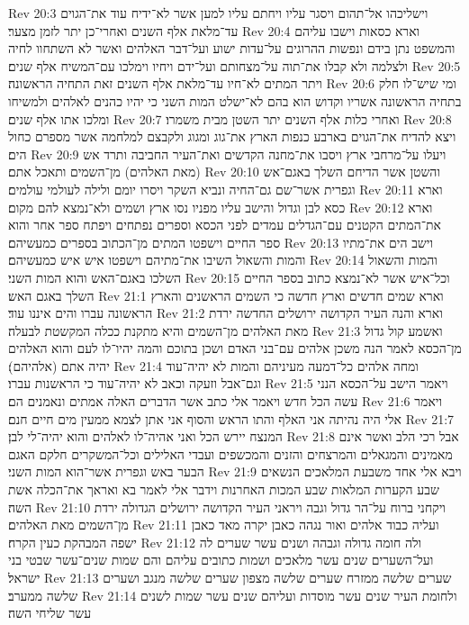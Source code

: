 Rev 20:3  וישליכהו אל־תהום ויסגר עליו ויחתם עליו למען אשר לא־ידיח עוד את־הגוים עד־מלאת אלף השנים ואחרי־כן יתר לזמן מצער׃
Rev 20:4  וארא כסאות וישבו עליהם והמשפט נתן בידם ונפשות ההרוגים על־עדות ישוע ועל־דבר האלהים ואשר לא השתחוו לחיה ולצלמה ולא קבלו את־תוה על־מצחותם ועל־ידם ויחיו וימלכו עם־המשיח אלף שנים׃
Rev 20:5  ויתר המתים לא־חיו עד־מלאת אלף השנים זאת התחיה הראשונה׃
Rev 20:6  ומי שיש־לו חלק בתחיה הראשונה אשריו וקדוש הוא בהם לא־ישלט המות השני כי יהיו כהנים לאלהים ולמשיחו ומלכו אתו אלף שנים׃
Rev 20:7  ואחרי כלות אלף השנים יתר השטן מבית משמרו׃
Rev 20:8  ויצא להדיח את־הגוים בארבע כנפות הארץ את־גוג ומגוג ולקבצם למלחמה אשר מספרם כחול הים׃
Rev 20:9  ויעלו על־מרחבי ארץ ויסבו את־מחנה הקדשים ואת־העיר החביבה ותרד אש (מאת האלהים) מן־השמים ותאכל אתם׃
Rev 20:10  והשטן אשר הדיחם השלך באגם־אש וגפרית אשר־שם גם־החיה ונביא השקר ויסרו יומם ולילה לעולמי עולמים׃
Rev 20:11  וארא כסא לבן וגדול והישב עליו מפניו נסו ארץ ושמים ולא־נמצא להם מקום׃
Rev 20:12  וארא את־המתים הקטנים עם־הגדלים עמדים לפני הכסא וספרים נפתחים ויפתח ספר אחר והוא ספר החיים וישפטו המתים מן־הכתוב בספרים כמעשיהם׃
Rev 20:13  וישב הים את־מתיו והמות והשאול השיבו את־מתיהם וישפטו איש איש כמעשיהם׃
Rev 20:14  והמות והשאול השלכו באגם־האש והוא המות השני׃
Rev 20:15  וכל־איש אשר לא־נמצא כתוב בספר החיים השלך באגם האש׃
Rev 21:1  וארא שמים חדשים וארץ חדשה כי השמים הראשנים והארץ הראשונה עברו והים איננו עוד׃
Rev 21:2  וארא והנה העיר הקדושה ירושלים החדשה ירדת מאת האלהים מן־השמים והיא מתקנת ככלה המקשטת לבעלה׃
Rev 21:3  ואשמע קול גדול מן־הכסא לאמר הנה משכן אלהים עם־בני האדם ושכן בתוכם והמה יהיו־לו לעם והוא האלהים יהיה אתם (אלהיהם)׃
Rev 21:4  ומחה אלהים כל־דמעה מעיניהם והמות לא יהיה־עוד וגם־אבל וזעקה וכאב לא יהיה־עוד כי הראשנות עברו׃
Rev 21:5  ויאמר הישב על־הכסא הנני עשה הכל חדש ויאמר אלי כתב אשר הדברים האלה אמתים ונאמנים הם׃
Rev 21:6  ויאמר אלי היה נהיתה אני האלף והתו הראש והסוף אני אתן לצמא ממעין מים חיים חנם׃
Rev 21:7  המנצח יירש הכל ואני אהיה־לו לאלהים והוא יהיה־לי לבן׃
Rev 21:8  אבל רכי הלב ואשר אינם מאמינים והמגאלים והמרצחים והזנים והמכשפים ועבדי האלילים וכל־המשקרים חלקם האגם הבער באש וגפרית אשר־הוא המות השני׃
Rev 21:9  ויבא אלי אחד משבעת המלאכים הנשאים שבע הקערות המלאות שבע המכות האחרנות וידבר אלי לאמר בא ואראך את־הכלה אשת השה׃
Rev 21:10  ויקחני ברוח על־הר גדול וגבה ויראני העיר הקדושה ירושלים הגדולה ירדת מן־השמים מאת האלהים׃
Rev 21:11  ועליה כבוד אלהים ואור נגהה כאבן יקרה מאד כאבן ישפה המבהקת כעין הקרח׃
Rev 21:12  ולה חומה גדולה וגבהה ושנים עשר שערים לה ועל־השערים שנים עשר מלאכים ושמות כתובים עליהם והם שמות שנים־עשר שבטי בני ישראל׃
Rev 21:13  שערים שלשה ממזרח שערים שלשה מצפון שערים שלשה מנגב ושערים שלשה ממערב׃
Rev 21:14  ולחומת העיר שנים עשר מוסדות ועליהם שנים עשר שמות לשנים עשר שליחי השה׃
